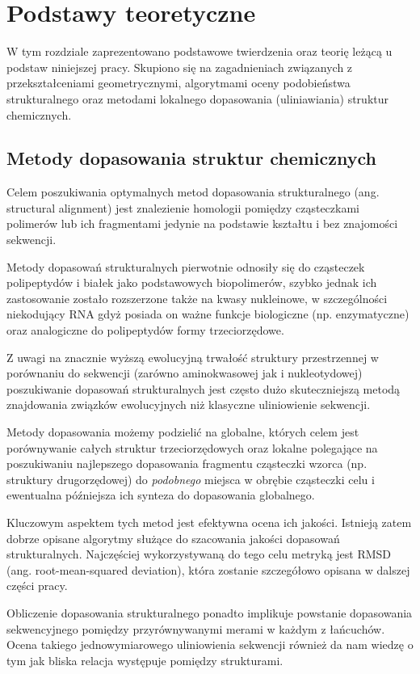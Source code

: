 \documentclass[licencjacka]{pracamgr}
\begin{document}
\chapter{Podstawy teoretyczne}
W tym rozdziale zaprezentowano podstawowe twierdzenia oraz teorię leżącą u podstaw niniejszej pracy. Skupiono się na zagadnieniach związanych z przekształceniami geometrycznymi, algorytmami oceny podobieństwa strukturalnego oraz metodami lokalnego dopasowania (uliniawiania) struktur chemicznych.

\section{Metody dopasowania struktur chemicznych}
Celem poszukiwania optymalnych metod dopasowania strukturalnego (ang. structural alignment) jest znalezienie homologii pomiędzy cząsteczkami polimerów lub ich fragmentami jedynie na podstawie kształtu i bez znajomości sekwencji. 

Metody dopasowań strukturalnych pierwotnie odnosiły się do cząsteczek polipeptydów i białek jako podstawowych biopolimerów, szybko jednak ich zastosowanie zostało rozszerzone także na kwasy nukleinowe, w szczególności niekodujący RNA gdyż posiada on ważne funkcje biologiczne (np. enzymatyczne) oraz analogiczne do polipeptydów formy trzeciorzędowe. 

Z uwagi na znacznie wyższą ewolucyjną trwałość struktury przestrzennej w porównaniu do sekwencji (zarówno aminokwasowej jak i nukleotydowej) poszukiwanie dopasowań strukturalnych jest często dużo skuteczniejszą metodą znajdowania związków ewolucyjnych niż klasyczne uliniowienie sekwencji. 

Metody dopasowania możemy podzielić na globalne, których celem jest porównywanie całych struktur trzeciorzędowych oraz lokalne polegające na poszukiwaniu najlepszego dopasowania fragmentu cząsteczki wzorca (np. struktury drugorzędowej) do \textit{podobnego} miejsca w obrębie cząsteczki celu i ewentualna późniejsza ich synteza do dopasowania globalnego.

Kluczowym aspektem tych metod jest efektywna ocena ich jakości. Istnieją zatem dobrze opisane algorytmy służące do szacowania jakości dopasowań strukturalnych. Najczęściej wykorzystywaną do tego celu metryką jest RMSD (ang. root-mean-squared deviation), która zostanie szczegółowo opisana w dalszej części pracy.

Obliczenie dopasowania strukturalnego ponadto implikuje powstanie dopasowania sekwencyjnego pomiędzy przyrównywanymi merami w każdym z łańcuchów. Ocena takiego jednowymiarowego uliniowienia sekwencji również da nam wiedzę o tym jak bliska relacja występuje pomiędzy strukturami.
\end{document}
